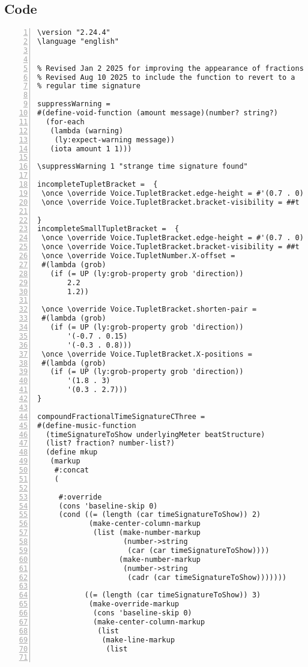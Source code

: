 \subsection{Code}
\begin{Verbatim}[numbers=left,xleftmargin=5mm]
\version "2.24.4"
\language "english"


% Revised Jan 2 2025 for improving the appearance of fractions
% Revised Aug 10 2025 to include the function to revert to a
% regular time signature

suppressWarning =
#(define-void-function (amount message)(number? string?)
  (for-each
   (lambda (warning)
    (ly:expect-warning message))
   (iota amount 1 1)))

\suppressWarning 1 "strange time signature found"

incompleteTupletBracket =  {
 \once \override Voice.TupletBracket.edge-height = #'(0.7 . 0)
 \once \override Voice.TupletBracket.bracket-visibility = ##t

}
incompleteSmallTupletBracket =  {
 \once \override Voice.TupletBracket.edge-height = #'(0.7 . 0)
 \once \override Voice.TupletBracket.bracket-visibility = ##t
 \once \override Voice.TupletNumber.X-offset =
 #(lambda (grob)
   (if (= UP (ly:grob-property grob 'direction))
       2.2
       1.2))

 \once \override Voice.TupletBracket.shorten-pair =
 #(lambda (grob)
   (if (= UP (ly:grob-property grob 'direction))
       '(-0.7 . 0.15)
       '(-0.3 . 0.8)))
 \once \override Voice.TupletBracket.X-positions =
 #(lambda (grob)
   (if (= UP (ly:grob-property grob 'direction))
       '(1.8 . 3)
       '(0.3 . 2.7)))
}

compoundFractionalTimeSignatureCThree =
#(define-music-function
  (timeSignatureToShow underlyingMeter beatStructure)
  (list? fraction? number-list?)
  (define mkup
   (markup
    #:concat
    (

     #:override
     (cons 'baseline-skip 0)
     (cond ((= (length (car timeSignatureToShow)) 2)
            (make-center-column-markup
             (list (make-number-markup
                    (number->string
                     (car (car timeSignatureToShow))))
                   (make-number-markup
                    (number->string
                     (cadr (car timeSignatureToShow)))))))

           ((= (length (car timeSignatureToShow)) 3)
            (make-override-markup
             (cons 'baseline-skip 0)
             (make-center-column-markup
              (list
               (make-line-markup
                (list


\end{Verbatim}
